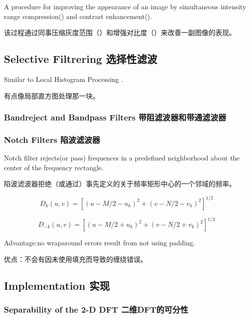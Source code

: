 \documentclass[12pt]{article}
\numberwithin{equation}{section}%
\begin{document}
A procedure for improving the appearance of an image by simultaneous intensity range compression({\color{blue}{$\ln$}}) and contrast enhancement({\color{blue}{filter}}).

该过程通过同事压缩灰度范围（{\color{blue}{$\ln$}}）和增强对比度（{\color{blue}{filter}}）来改善一副图像的表现。

\subsection{Selective Filtrering 选择性滤波}

Similar to Local Histogram Processing .

有点像局部直方图处理那一块。

\subsubsection{Bandreject and Bandpass Filters 带阻滤波器和带通滤波器}

\subsubsection{Notch Filters 陷波滤波器}

Notch filter rejects(or pass) frequences in a predefined neighborhood about the center of the frequency rectangle.

陷波滤波器拒绝（或通过）事先定义的关于频率矩形中心的一个邻域的频率。

\begin{equation} \label{4.61}
D_{k}(u,v)=[(u-M/2-u_{k})^{2}+(v-N/2-v_{k})^{2}]^{1/2}
\end{equation}

\begin{equation} \label{4.62}
D_{-k}(u,v)=[(u-M/2+u_{k})^{2}+(v-N/2+v_{k})^{2}]^{1/2}
\end{equation}

Advantage:no wraparound errors result from not using padding.

优点：不会有因未使用填充而导致的缠绕错误。

\subsection{Implementation 实现}

\subsubsection{Separability of the 2-D DFT 二维DFT的可分性}
\end{document}
